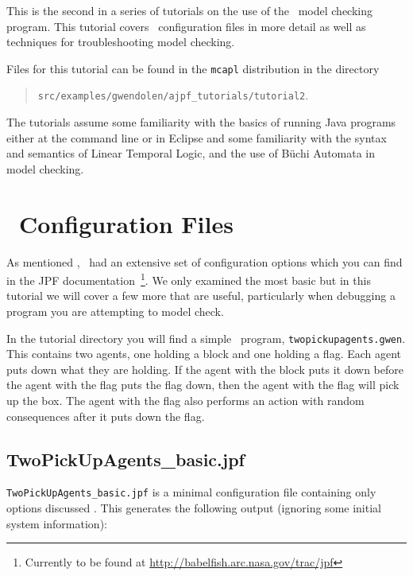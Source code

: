 \label{tutorial:ajpf:troubleshooting}

This is the second in a series of tutorials on the use of the \ajpf\ model checking program.  This tutorial covers \jpf\ configuration files in more detail as well as techniques for troubleshooting model checking.

Files for this tutorial can be found in the \texttt{mcapl} distribution in the directory 
\begin{quote}
\texttt{src/examples/gwendolen/ajpf\_tutorials/tutorial2}.
\end{quote}

The tutorials assume some familiarity with the basics of running Java programs either at the command line or in Eclipse and some familiarity with the syntax and semantics of Linear Temporal Logic, and the use of B\"{u}chi Automata in model checking.

\section{\jpf\ Configuration Files}
As mentioned , \jpf\ had an extensive set of configuration options which you can find in the JPF documentation~\footnote{Currently to be found at \url{http://babelfish.arc.nasa.gov/trac/jpf}}. We only examined the most basic   but in this tutorial we will cover a few more that are useful, particularly when debugging a program you are attempting to model check.

\begin{sloppypar}
In the tutorial directory you will find a simple \gwendolen\ program, \texttt{twopickupagents.gwen}.  This contains two agents, one holding a block and one holding a flag.  Each agent puts down what they are holding.  If the agent with the block puts it down before the agent with the flag puts the flag down, then the agent with the flag will pick up the box.  The agent with the flag also performs an action with random consequences after it puts down the flag.
\end{sloppypar}

\subsection{TwoPickUpAgents\_basic.jpf} \texttt{TwoPickUpAgents\_basic.jpf} is a minimal configuration file containing only options discussed .  This generates the following output (ignoring some initial system information):

